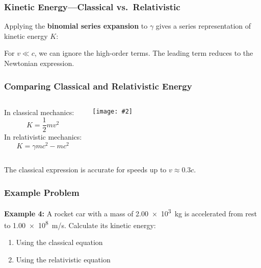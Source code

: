 \documentclass[12pt,compress,aspectratio=169]{beamer}
\newcommand{\pic}[2]{\texttt{[image: \#2]}}
\begin{document}
\begin{frame}
  \frametitle{Kinetic Energy---Classical vs.\ Relativistic}
  Applying the \textbf{binomial series expansion} to $\gamma$ gives a
  series representation of kinetic energy $K$:

  
  For $v\ll c$, we can ignore the high-order terms. The leading term reduces to
  the Newtonian expression.
\end{frame}


\begin{frame}
  \frametitle{Comparing Classical and Relativistic Energy}
  \begin{columns}
    In classical mechanics:
    {\Large
      \begin{displaymath}
        K=\frac{1}{2} mv^2
      \end{displaymath}
    }
    In relativistic mechanics:
    {\Large
      \begin{displaymath}
        K=\gamma mc^2-mc^2
      \end{displaymath}
    }
    
    \pic{.85}{graphics/e_k.png}
  \end{columns}

  The classical expression is accurate for speeds up to $v\approx 0.3c$.
\end{frame}

\begin{frame}
  \frametitle{Example Problem}
  \textbf{Example 4:} A rocket car with a mass of \SI{2.00e3}{kg} is accelerated
  from rest to \SI{1.00e8}{m/s}. Calculate its kinetic energy:
  \begin{enumerate}
  \item Using the classical equation
  \item Using the relativistic equation
  \end{enumerate}
\end{frame}
\end{document}
